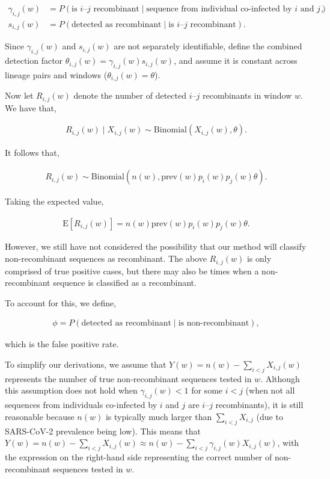 \documentclass[11pt,oneside,letterpaper]{article}
\begin{document}
\begin{align*}
\gamma_{i,j}(w) &=  
P\left(\text{is }i\text{--}j\text{ recombinant}\mid\text{sequence from individual co-infected by }i\text{ and }j\right), \\
s_{i,j}(w) &=  
P\left(\text{detected as recombinant}\mid\text{is }i\text{--}j\text{ recombinant}\right).
\end{align*}

Since $\gamma_{i,j}(w)$ and $s_{i,j}(w)$ are not separately identifiable, define the combined detection factor
$\theta_{i,j}(w)=\gamma_{i,j}(w)s_{i,j}(w)$, and assume it is constant across lineage pairs and windows ($\theta_{i,j}(w)=\theta$). 


Now let $R_{i,j}(w)$ denote the number of detected $i\text{--}j$ recombinants in window $w$. We have that,

\begin{align*}
R_{i,j}(w)\mid X_{i,j}(w)\sim\mathrm{Binomial}\left(X_{i,j}(w), \theta\right).
\end{align*}

It follows that,

\begin{align*}
R_{i,j}(w)\sim\mathrm{Binomial}\left(n(w), \mathrm{prev}(w)p_i(w)p_j(w)\theta\right).
\end{align*}

Taking the expected value, 

\begin{align*}
\mathrm{E}\left[R_{i,j}(w)\right]
= n(w)\mathrm{prev}(w)p_i(w)p_j(w)\theta.
\end{align*}

However, we still have not considered the possibility that our method will classify non-recombinant sequences as recombinant. The above $R_{i,j}(w)$ is only comprised of true positive cases, but there may also be times when a non-recombinant sequence is classified as a recombinant. 

To account for this, we define,

\begin{align*}
\phi = P\left(\text{detected as recombinant}\mid\text{is non-recombinant}\right),
\end{align*}

which is the false positive rate.

To simplify our derivations, we assume that $Y(w) = n(w) - \sum_{i<j} X_{i,j}(w)$ represents the number of true non-recombinant sequences tested in $w$. Although this assumption does not hold when $\gamma_{i,j}(w) < 1$ for some $i<j$ (when not all sequences from individuals co-infected by $i$ and $j$ are $i\text{--}j$ recombinants), it is still reasonable because $n(w)$ is typically much larger than $\sum_{i<j} X_{i,j}$ (due to SARS-CoV-2 prevalence being low). This means that $Y(w) = n(w) - \sum_{i<j} X_{i,j}(w) \approx n(w) - \sum_{i<j} \gamma_{i,j}(w) X_{i,j}(w)$, with the expression on the right-hand side representing the correct number of non-recombinant sequences tested in $w$. 
\end{document}
